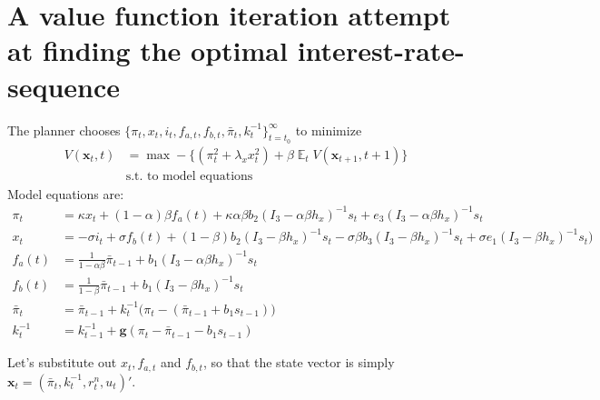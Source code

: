 \documentclass[11pt]{article}
\renewcommand{\[}{\begin{equation}}
\renewcommand{\]}{\end{equation}}
\DeclareMathOperator{\E}{\mathbb{E}}
\begin{document}
\section{A value function iteration attempt at finding the optimal interest-rate-sequence}
The planner chooses $\{\pi_t, x_t, i_t, f_{a,t},  f_{b,t}, \bar{\pi}_t, k_t^{-1}\}_{t=t_0}^{\infty}$ to minimize
\begin{align}
V(\mathbf{x}_t,t)& = \max -\bigg\{ (\pi_t^2 + \lambda_x x_t^2) + \beta \E_t V(\mathbf{x}_{t+1},t+1) \bigg\} \\
& \text{s.t. to model equations}
\end{align}
Model equations are:
 \begin{align}
 \pi_t & = \kappa x_t +(1-\alpha)\beta f_a(t) +\kappa\alpha\beta b_2 (I_3 - \alpha\beta h_x)^{-1}s_t +e_3(I_3 - \alpha\beta h_x)^{-1}s_t  \label{midsimple_first}\\
 x_t & = -\sigma i_t +\sigma f_b(t)  +  (1-\beta)b_2 (I_3 - \beta h_x)^{-1}s_t - \sigma\beta b_3 (I_3 - \beta h_x)^{-1}s_t +\sigma e_1(I_3 - \beta h_x)^{-1}s_t  \big) \\
 f_a(t) &= \frac{1}{1-\alpha\beta}\bar{\pi}_{t-1}  + b_1(I_3 - \alpha\beta h_x)^{-1}s_t  \\
 f_b(t) & = \frac{1}{1-\beta}\bar{\pi}_{t-1}  + b_1(I_3 - \beta h_x)^{-1}s_t  \\
 \bar{\pi}_{t} & = \bar{\pi}_{t-1} + k_t^{-1}\big(\pi_{t} -(\bar{\pi}_{t-1}+b_1 s_{t-1}) \big)     \\
 k_t^{-1} & = k_{t-1}^{-1}+ \mathbf{g}(\pi_t - \bar{\pi}_{t-1}-b_1 s_{t-1})  
 \label{midsimple_last}
\end{align}

\newpage
Let's substitute out $x_t, f_{a,t}$ and $f_{b,t}$, so that the state vector is simply $\mathbf{x}_t = (\bar{\pi}_t, k_t^{-1},r_t^n,u_t)'$.
\end{document}
